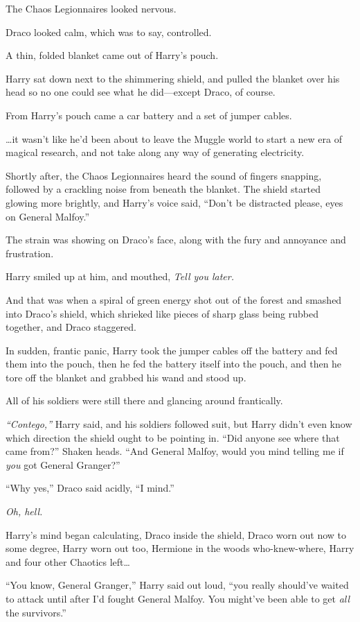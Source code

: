 The Chaos Legionnaires looked nervous.

Draco looked calm, which was to say, controlled.

A thin, folded blanket came out of Harry's pouch.

Harry sat down next to the shimmering shield, and pulled the blanket
over his head so no one could see what he did---except Draco, of course.

From Harry's pouch came a car battery and a set of jumper cables.

\ldots{}it wasn't like he'd been about to leave the Muggle world to
start a new era of magical research, and not take along any way of
generating electricity.

Shortly after, the Chaos Legionnaires heard the sound of fingers
snapping, followed by a crackling noise from beneath the blanket. The
shield started glowing more brightly, and Harry's voice said, ``Don't be
distracted please, eyes on General Malfoy.''

The strain was showing on Draco's face, along with the fury and
annoyance and frustration.

Harry smiled up at him, and mouthed, \emph{Tell you later.}

And that was when a spiral of green energy shot out of the forest and
smashed into Draco's shield, which shrieked like pieces of sharp glass
being rubbed together, and Draco staggered.

In sudden, frantic panic, Harry took the jumper cables off the battery
and fed them into the pouch, then he fed the battery itself into the
pouch, and then he tore off the blanket and grabbed his wand and stood
up.

All of his soldiers were still there and glancing around frantically.

\emph{``Contego,''} Harry said, and his soldiers followed suit, but
Harry didn't even know which direction the shield ought to be pointing
in. ``Did anyone see where that came from?'' Shaken heads. ``And General
Malfoy, would you mind telling me if \emph{you} got General Granger?''

``Why yes,'' Draco said acidly, ``I mind.''

\emph{Oh, hell.}

Harry's mind began calculating, Draco inside the shield, Draco worn out
now to some degree, Harry worn out too, Hermione in the woods
who-knew-where, Harry and four other Chaotics left\ldots{}

``You know, General Granger,'' Harry said out loud, ``you really
should've waited to attack until after I'd fought General Malfoy. You
might've been able to get \emph{all} the survivors.''

